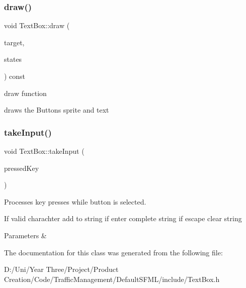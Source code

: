 \subsubsection{\texorpdfstring{draw()}{draw()}}
{\footnotesize\ttfamily void Text\+Box\+::draw (\begin{DoxyParamCaption}\item[{Render\+Target \&}]{target,  }\item[{Render\+States}]{states }\end{DoxyParamCaption}) const}



draw function 

draws the Buttons sprite and text \hypertarget{class_text_box_a9139c31dc807fa0c478215086f3fc7f1}{}\label{class_text_box_a9139c31dc807fa0c478215086f3fc7f1} 
\subsubsection{\texorpdfstring{take\+Input()}{takeInput()}}
{\footnotesize\ttfamily void Text\+Box\+::take\+Input (\begin{DoxyParamCaption}\item[{Keyboard\+::\+Key}]{pressed\+Key }\end{DoxyParamCaption})}



Processes key presses while button is selected. 

If valid charachter add to string if enter complete string if escape clear string


\begin{DoxyParams}{Parameters}
{\em } & \\
\hline
\end{DoxyParams}


The documentation for this class was generated from the following file\+:\begin{DoxyCompactItemize}
\item 
D\+:/\+Uni/\+Year Three/\+Project/\+Product Creation/\+Code/\+Traffic\+Management/\+Default\+S\+F\+M\+L/include/Text\+Box.\+h\end{DoxyCompactItemize}
